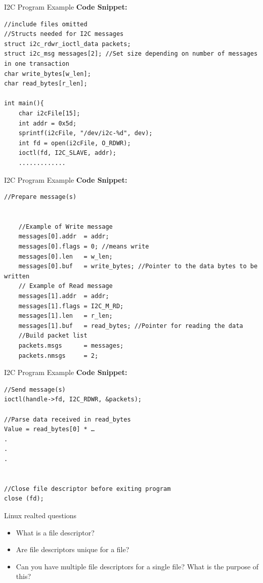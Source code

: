 \begin{frame}[fragile]{I2C Program Example}
    \textbf{Code Snippet:}
    \begin{verbatim}
//include files omitted
//Structs needed for I2C messages
struct i2c_rdwr_ioctl_data packets;
struct i2c_msg messages[2]; //Set size depending on number of messages in one transaction
char write_bytes[w_len];
char read_bytes[r_len];

int main(){
    char i2cFile[15];
    int addr = 0x5d; 
    sprintf(i2cFile, "/dev/i2c-%d", dev);
    int fd = open(i2cFile, O_RDWR); 
    ioctl(fd, I2C_SLAVE, addr);
    .............

    \end{verbatim}

\end{frame}

\begin{frame}[fragile]{I2C Program Example}
    \textbf{Code Snippet:}
    \begin{verbatim}
//Prepare message(s)


    //Example of Write message
    messages[0].addr  = addr;
    messages[0].flags = 0; //means write
    messages[0].len   = w_len;
    messages[0].buf   = write_bytes; //Pointer to the data bytes to be written 
    // Example of Read message
    messages[1].addr  = addr;
    messages[1].flags = I2C_M_RD;
    messages[1].len   = r_len; 
    messages[1].buf   = read_bytes; //Pointer for reading the data
    //Build packet list
    packets.msgs      = messages;
    packets.nmsgs     = 2;

    \end{verbatim}

\end{frame}

\begin{frame}[fragile]{I2C Program Example}
    \textbf{Code Snippet:}
    \begin{verbatim}
//Send message(s)
ioctl(handle->fd, I2C_RDWR, &packets);

//Parse data received in read_bytes
Value = read_bytes[0] * …
.
.
.


//Close file descriptor before exiting program
close (fd);

    \end{verbatim}

\end{frame}

\begin{frame}{Linux realted questions}
    \begin{itemize}
        \item What is a file descriptor?
        \item Are file descriptors unique for a file?
        \item Can you have multiple file descriptors for a single file? What is the purpose of this?
    \end{itemize}    
\end{frame}


